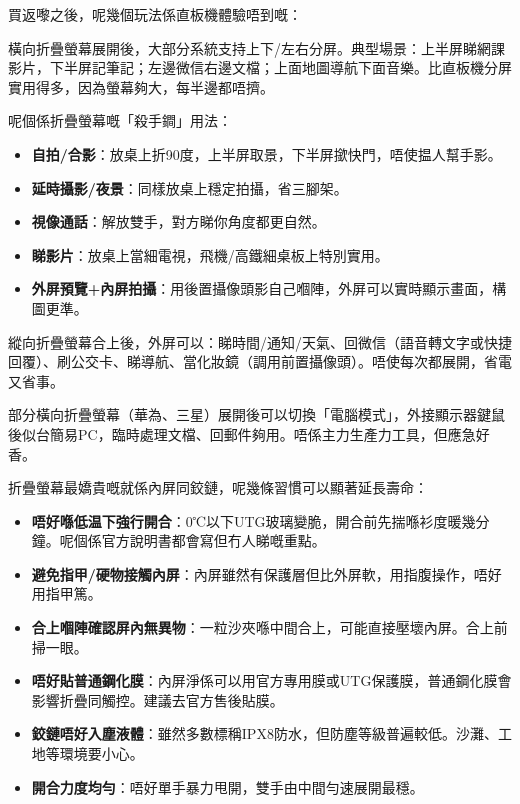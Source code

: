 
買返嚟之後，呢幾個玩法係直板機體驗唔到嘅：


橫向折疊螢幕展開後，大部分系統支持上下/左右分屏。典型場景：上半屏睇網課影片，下半屏記筆記；左邊微信右邊文檔；上面地圖導航下面音樂。比直板機分屏實用得多，因為螢幕夠大，每半邊都唔擠。


呢個係折疊螢幕嘅「殺手鐧」用法：

\begin{itemize}
  \item \textbf{自拍/合影}：放桌上折90度，上半屏取景，下半屏撳快門，唔使揾人幫手影。
  \item \textbf{延時攝影/夜景}：同樣放桌上穩定拍攝，省三腳架。
  \item \textbf{視像通話}：解放雙手，對方睇你角度都更自然。
  \item \textbf{睇影片}：放桌上當細電視，飛機/高鐵細桌板上特別實用。
  \item \textbf{外屏預覽+內屏拍攝}：用後置攝像頭影自己嗰陣，外屏可以實時顯示畫面，構圖更準。
\end{itemize}


縱向折疊螢幕合上後，外屏可以：睇時間/通知/天氣、回微信（語音轉文字或快捷回覆）、刷公交卡、睇導航、當化妝鏡（調用前置攝像頭）。唔使每次都展開，省電又省事。


部分橫向折疊螢幕（華為、三星）展開後可以切換「電腦模式」，外接顯示器鍵鼠後似台簡易PC，臨時處理文檔、回郵件夠用。唔係主力生產力工具，但應急好香。


折疊螢幕最嬌貴嘅就係內屏同鉸鏈，呢幾條習慣可以顯著延長壽命：

\begin{itemize}
  \item \textbf{唔好喺低温下強行開合}：0℃以下UTG玻璃變脆，開合前先揣喺衫度暖幾分鐘。呢個係官方說明書都會寫但冇人睇嘅重點。
  \item \textbf{避免指甲/硬物接觸內屏}：內屏雖然有保護層但比外屏軟，用指腹操作，唔好用指甲篤。
  \item \textbf{合上嗰陣確認屏內無異物}：一粒沙夾喺中間合上，可能直接壓壞內屏。合上前掃一眼。
  \item \textbf{唔好貼普通鋼化膜}：內屏淨係可以用官方專用膜或UTG保護膜，普通鋼化膜會影響折疊同觸控。建議去官方售後貼膜。
  \item \textbf{鉸鏈唔好入塵液體}：雖然多數標稱IPX8防水，但防塵等級普遍較低。沙灘、工地等環境要小心。
  \item \textbf{開合力度均勻}：唔好單手暴力甩開，雙手由中間勻速展開最穩。
\end{itemize}

